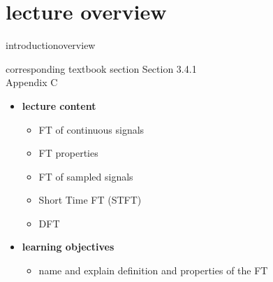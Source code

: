 


\subtitle{Module 3.4.1: Time-Frequency Representations~---~Fourier Transform}


	

    \section[overview]{lecture overview}
        \begin{frame}{introduction}{overview}
            \begin{block}{corresponding textbook section}
                    Section 3.4.1\\
                    Appendix C
            \end{block}

            \begin{itemize}
                \item   \textbf{lecture content}
                    \begin{itemize}
                        \item   FT of continuous signals  
                        \item   FT properties
                        \item   FT of sampled signals
                        \item   Short Time FT (STFT)
                        \item   DFT
                    \end{itemize}
                \bigskip
                \item<2->   \textbf{learning objectives}
                    \begin{itemize}
                        \item   name and explain definition and properties of the FT
                    \end{itemize}
            \end{itemize}
        \end{frame}

